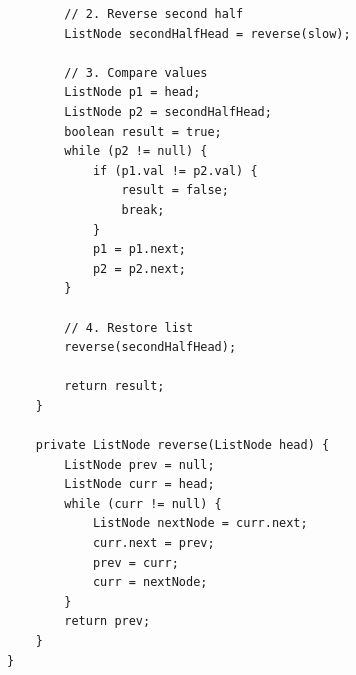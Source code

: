 \documentclass[10pt,journal,compsoc,onecolumn]{IEEEtran}
\begin{document}
\begin{verbatim}
        // 2. Reverse second half
        ListNode secondHalfHead = reverse(slow);
        
        // 3. Compare values
        ListNode p1 = head;
        ListNode p2 = secondHalfHead;
        boolean result = true;
        while (p2 != null) {
            if (p1.val != p2.val) {
                result = false;
                break;
            }
            p1 = p1.next;
            p2 = p2.next;
        }
        
        // 4. Restore list
        reverse(secondHalfHead);
        
        return result;
    }

    private ListNode reverse(ListNode head) {
        ListNode prev = null;
        ListNode curr = head;
        while (curr != null) {
            ListNode nextNode = curr.next;
            curr.next = prev;
            prev = curr;
            curr = nextNode;
        }
        return prev;
    }
}
\end{verbatim}
\end{document}
